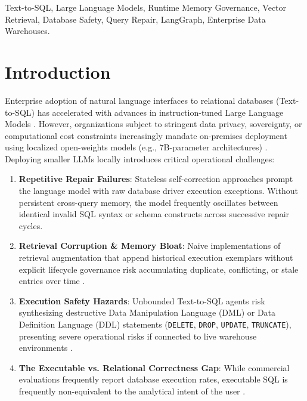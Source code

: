 \begin{IEEEkeywords}
Text-to-SQL, Large Language Models, Runtime Memory Governance, Vector Retrieval, Database Safety, Query Repair, LangGraph, Enterprise Data Warehouses.
\end{IEEEkeywords}

\section{Introduction}
Enterprise adoption of natural language interfaces to relational databases (Text-to-SQL) has accelerated with advances in instruction-tuned Large Language Models \cite{pourreza2023dinsql, gao2024dailsql}. However, organizations subject to stringent data privacy, sovereignty, or computational cost constraints increasingly mandate on-premises deployment using localized open-weights models (e.g., 7B-parameter architectures) \cite{qwen2024qwen25}. Deploying smaller LLMs locally introduces critical operational challenges:
\begin{enumerate}
    \item \textbf{Repetitive Repair Failures}: Stateless self-correction approaches \cite{madaan2023selfrefine, shinn2023reflexion} prompt the language model with raw database driver execution exceptions. Without persistent cross-query memory, the model frequently oscillates between identical invalid SQL syntax or schema constructs across successive repair cycles.
    \item \textbf{Retrieval Corruption \& Memory Bloat}: Naive implementations of retrieval augmentation \cite{lewis2020rag} that append historical execution exemplars without explicit lifecycle governance risk accumulating duplicate, conflicting, or stale entries over time \cite{park2023generativeagents, packer2023memgpt}.
    \item \textbf{Execution Safety Hazards}: Unbounded Text-to-SQL agents risk synthesizing destructive Data Manipulation Language (DML) or Data Definition Language (DDL) statements (\texttt{DELETE}, \allowbreak\texttt{DROP}, \allowbreak\texttt{UPDATE}, \allowbreak\texttt{TRUNCATE}), presenting severe operational risks if connected to live warehouse environments \cite{rebedea2023nemoguardrails, mao2023sqlglot, halfond2005amnesia}.
    \item \textbf{The Executable vs. Relational Correctness Gap}: While commercial evaluations frequently report database execution rates, executable SQL is frequently non-equivalent to the analytical intent of the user \cite{finegandollak2018eval, zhong2020distilled}.
\end{enumerate}

